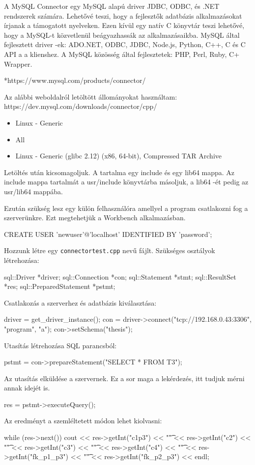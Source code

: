 
A MySQL Connector egy MySQL alapú driver JDBC, ODBC, és .NET rendszerek számára. Lehetővé teszi, hogy a fejlesztők adatbázis alkalmazásokat írjanak a támogatott nyelveken. Ezen kívül egy natív C könyvtár teszi lehetővé, hogy a MySQL-t közvetlenül beágyazhassák az alkalmazásaikba.
MySQL által fejlesztett driver -ek:
ADO.NET, ODBC, JDBC, Node.js, Python, C++, C és C API a a klienshez. 
A MySQL közösség által fejlesztetek:
PHP, Perl, Ruby, C+ Wrapper.

*https://www.mysql.com/products/connector/


Az alábbi weboldalról letöltött állományokat használtam:\newline
https://dev.mysql.com/downloads/connector/cpp/
\begin{itemize}
\item Linux - Generic
\item All
\item Linux - Generic (glibc 2.12) (x86, 64-bit), Compressed TAR Archive
\end{itemize}

Letöltés után kicsomagoljuk. A tartalma egy include és egy lib64 mappa. Az include mappa tartalmát a usr/include könyvtárba másoljuk, a lib64 -ét pedig az usr/lib64 mappába.

Ezután szükség lesz egy külön felhasználóra amellyel a program csatlakozni fog a szerverünkre. Ezt megtehetjük a Workbench alkalmazásban.
\begin{python}
CREATE USER 'newuser'@'localhost' IDENTIFIED BY 'password';
\end{python}


Hozzunk létre egy \texttt{connectortest.cpp} nevű fájlt.
Szükséges osztályok létrehozása:
\begin{cpp}
sql::Driver *driver;
sql::Connection *con;
sql::Statement *stmt;
sql::ResultSet *res;
sql::PreparedStatement *pstmt;
\end{cpp}
Csatlakozás a szerverhez és adatbázis kiválasztása:
\begin{cpp}
driver = get_driver_instance();
con = driver->connect("tcp://192.168.0.43:3306", "program", "a");
con->setSchema("thesis");
\end{cpp}
Utasítás létrehozása SQL parancsból:
\begin{cpp}
pstmt = con->prepareStatement("SELECT * FROM T3");
\end{cpp}
Az utasítás elküldése a szervernek. Ez a sor maga a lekérdezés, itt tudjuk mérni annak idejét is.
\begin{cpp}
res = pstmt->executeQuery();
\end{cpp}
Az eredményt a szemléltetett módon lehet kiolvasni:
\begin{cpp}
 while (res->next())
      cout << res->getInt("c1p3") << "\t" << res->getInt("c2") << "\t"
           << res->getInt("c3") << "\t" << res->getInt("c4") << "\t"
           << res->getInt("fk_p1_p3") << "\t" << res->getInt("fk_p2_p3") 
           << endl;
\end{cpp}


